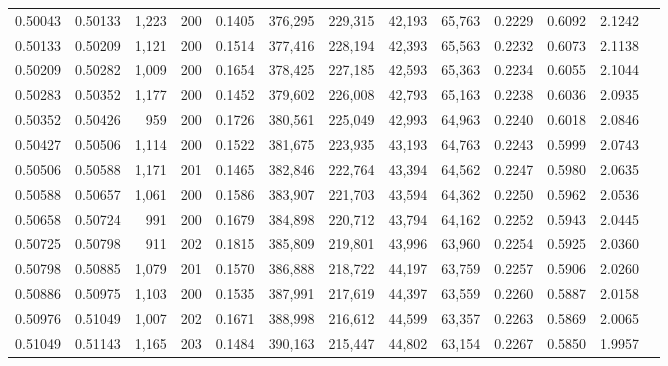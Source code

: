 \begin{tabular}{rrrrrrrrrrrrr}
0.50043 & 0.50133 & 1,223 & 200 &                                     0.1405 & 376,295 & 229,315 &  42,193 &  65,763 & 0.2229 & 0.6092 & 2.1242 \\
0.50133 & 0.50209 & 1,121 & 200 &                                     0.1514 & 377,416 & 228,194 &  42,393 &  65,563 & 0.2232 & 0.6073 & 2.1138 \\
0.50209 & 0.50282 & 1,009 & 200 &                                     0.1654 & 378,425 & 227,185 &  42,593 &  65,363 & 0.2234 & 0.6055 & 2.1044 \\
0.50283 & 0.50352 & 1,177 & 200 &                                     0.1452 & 379,602 & 226,008 &  42,793 &  65,163 & 0.2238 & 0.6036 & 2.0935 \\
0.50352 & 0.50426 &   959 & 200 &                                     0.1726 & 380,561 & 225,049 &  42,993 &  64,963 & 0.2240 & 0.6018 & 2.0846 \\
0.50427 & 0.50506 & 1,114 & 200 &                                     0.1522 & 381,675 & 223,935 &  43,193 &  64,763 & 0.2243 & 0.5999 & 2.0743 \\
0.50506 & 0.50588 & 1,171 & 201 &                                     0.1465 & 382,846 & 222,764 &  43,394 &  64,562 & 0.2247 & 0.5980 & 2.0635 \\
0.50588 & 0.50657 & 1,061 & 200 &                                     0.1586 & 383,907 & 221,703 &  43,594 &  64,362 & 0.2250 & 0.5962 & 2.0536 \\
0.50658 & 0.50724 &   991 & 200 &                                     0.1679 & 384,898 & 220,712 &  43,794 &  64,162 & 0.2252 & 0.5943 & 2.0445 \\
0.50725 & 0.50798 &   911 & 202 &                                     0.1815 & 385,809 & 219,801 &  43,996 &  63,960 & 0.2254 & 0.5925 & 2.0360 \\
0.50798 & 0.50885 & 1,079 & 201 &                                     0.1570 & 386,888 & 218,722 &  44,197 &  63,759 & 0.2257 & 0.5906 & 2.0260 \\
0.50886 & 0.50975 & 1,103 & 200 &                                     0.1535 & 387,991 & 217,619 &  44,397 &  63,559 & 0.2260 & 0.5887 & 2.0158 \\
0.50976 & 0.51049 & 1,007 & 202 &                                     0.1671 & 388,998 & 216,612 &  44,599 &  63,357 & 0.2263 & 0.5869 & 2.0065 \\
0.51049 & 0.51143 & 1,165 & 203 &                                     0.1484 & 390,163 & 215,447 &  44,802 &  63,154 & 0.2267 & 0.5850 & 1.9957 \\

\end{tabular}
